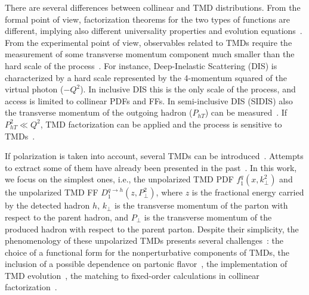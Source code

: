 \documentclass[aps,preprintnumbers,showpacs,nofootinbib,superscriptaddress,floatfix]{revtex4}
\newcommand{\T}{\perp}
\begin{document}
There are several differences between collinear and TMD distributions. From
the formal point of view, factorization theorems for the two types of
functions are different, implying also different universality
properties and evolution equations~\cite{Rogers:2015sqa}. From the
experimental point 
of view, observables related to TMDs require the measurement of some transverse
momentum component much smaller than the hard scale of the
process~\cite{Bacchetta:2016ccz,Radici:2016hbh}.  For
instance, Deep-Inelastic Scattering (DIS) is characterized by a hard scale represented by the
4-momentum squared of the virtual photon ($-Q^2$). In inclusive DIS this is
the only scale of the process, and access is limited to collinear PDFs
and FFs. In semi-inclusive DIS (SIDIS) also the transverse momentum of the
outgoing  
hadron ($P_{hT}$) can be measured~\cite{Mulders:1995dh,Bacchetta:2006tn}. 
If $P_{hT}^2\ll Q^2$, TMD
factorization can be applied and the process is sensitive to
TMDs~\cite{Collins:2011zzd}. 


If polarization is taken into account, several TMDs can be
introduced~\cite{Mulders:1995dh,Boer:1997nt,%
Bacchetta:2000jk,%
Mulders:2000sh,%
Boer:2016xqr%
}. Attempts to extract some of them have already been presented in the past~\cite{Bacchetta:2011gx,Anselmino:2012aa,Echevarria:2014xaa,Anselmino:2016uie,%
Lu:2009ip,Barone:2015ksa,%
Lefky:2014eia,%
Anselmino:2013vqa,Kang:2015msa%
}.  In
this work, we focus on the simplest ones, i.e., the unpolarized TMD
PDF $f_1^q(x,k_{\T}^2)$ and the unpolarized TMD
FF $D_1^{q \to h}(z,P_{\perp}^2)$, where $z$ is
  the fractional energy carried by the detected hadron $h$, $k_{\T}$ is the
  transverse momentum of the parton with respect to the parent hadron, and
  $P_{\perp}$ is the transverse momentum of the produced hadron with
  respect to the parent parton. Despite their
  simplicity, the phenomenology of these unpolarized TMDs presents several
  challenges~\cite{Signori:2016lvd}: the choice of a functional form 
  for the nonperturbative components of TMDs, 
  the inclusion of a possible dependence on partonic
  flavor~\cite{Signori:2013mda}, the implementation of TMD
  evolution~\cite{Bacchetta:2015ora,Rogers:2015sqa}, the matching to
  fixed-order calculations in collinear
  factorization~\cite{Collins:2016hqq}. 
\end{document}
